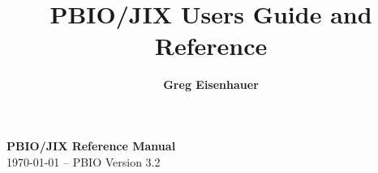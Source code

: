 \documentclass{article}
\title{PBIO/JIX Users Guide and Reference}
\author{ {\large\bf Greg Eisenhauer }\\
}
\begin{document}

\maketitle
\begin{center}
{\bf\titlefont PBIO/JIX Reference Manual}\\
\today{} -- PBIO Version 3.2
\end{center}
\thispagestyle{empty}

\end{document}

